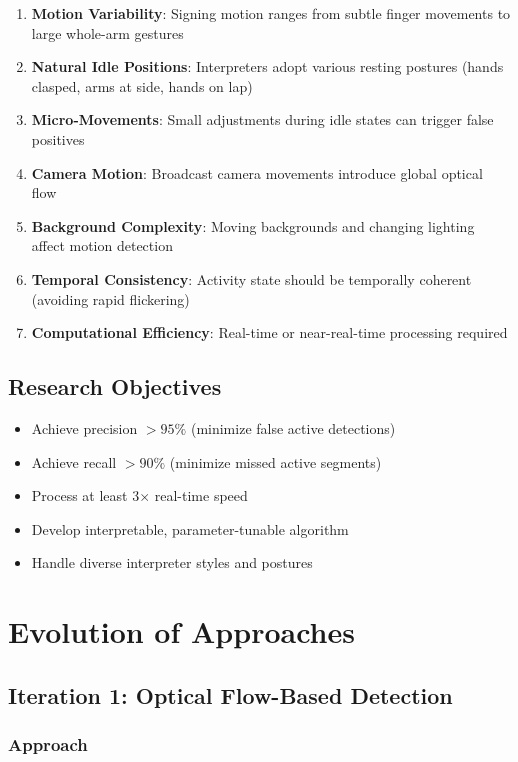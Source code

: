 \documentclass[11pt,a4paper]{article}
\begin{document}
\begin{enumerate}[leftmargin=*]
    \item \textbf{Motion Variability}: Signing motion ranges from subtle finger movements to large whole-arm gestures
    \item \textbf{Natural Idle Positions}: Interpreters adopt various resting postures (hands clasped, arms at side, hands on lap)
    \item \textbf{Micro-Movements}: Small adjustments during idle states can trigger false positives
    \item \textbf{Camera Motion}: Broadcast camera movements introduce global optical flow
    \item \textbf{Background Complexity}: Moving backgrounds and changing lighting affect motion detection
    \item \textbf{Temporal Consistency}: Activity state should be temporally coherent (avoiding rapid flickering)
    \item \textbf{Computational Efficiency}: Real-time or near-real-time processing required
\end{enumerate}

\subsection{Research Objectives}

\begin{itemize}
    \item Achieve precision $>95\%$ (minimize false active detections)
    \item Achieve recall $>90\%$ (minimize missed active segments)
    \item Process at least 3$\times$ real-time speed
    \item Develop interpretable, parameter-tunable algorithm
    \item Handle diverse interpreter styles and postures
\end{itemize}

\section{Evolution of Approaches}

\subsection{Iteration 1: Optical Flow-Based Detection}

\subsubsection{Approach}
\end{document}

